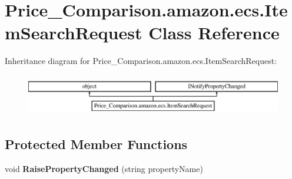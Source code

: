 \hypertarget{class_price___comparison_1_1amazon_1_1ecs_1_1_item_search_request}{\section{Price\-\_\-\-Comparison.\-amazon.\-ecs.\-Item\-Search\-Request Class Reference}
\label{class_price___comparison_1_1amazon_1_1ecs_1_1_item_search_request}
}


 


Inheritance diagram for Price\-\_\-\-Comparison.\-amazon.\-ecs.\-Item\-Search\-Request\-:\begin{figure}[H]
\begin{center}
\leavevmode
\includegraphics[height=1.830065cm]{class_price___comparison_1_1amazon_1_1ecs_1_1_item_search_request}
\end{center}
\end{figure}
\subsection*{Protected Member Functions}
\begin{DoxyCompactItemize}
\item 
\hypertarget{class_price___comparison_1_1amazon_1_1ecs_1_1_item_search_request_aa7542e7e4cc4210031f613f7d3d883ac}{void {\bfseries Raise\-Property\-Changed} (string property\-Name)}\label{class_price___comparison_1_1amazon_1_1ecs_1_1_item_search_request_aa7542e7e4cc4210031f613f7d3d883ac}

\end{DoxyCompactItemize}
